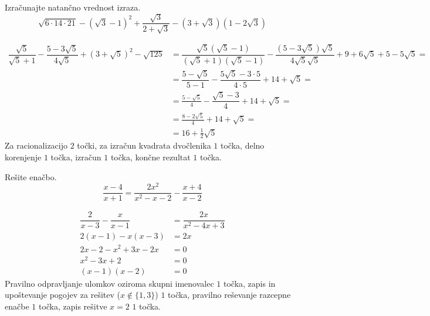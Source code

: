 \documentclass[addpoints]{exam}
\begin{document}
\begin{questions}


    \question[6]
    Izračunajte natančno vrednost izraza.
    $$ \sqrt{6\cdot 14\cdot 21}-\left(\sqrt{3}-1\right)^2+\dfrac{\sqrt{3}}{2+\sqrt{3}}-\left(3+\sqrt{3}\right)\left(1-2\sqrt{3}\right) $$

    \begin{solution}[7cm]
        \begin{align*} 
            \dfrac{\sqrt{5}}{\sqrt{5}+1}-\dfrac{5-3\sqrt{5}}{4\sqrt{5}}+\left(3+\sqrt{5}\right)^2-\sqrt{125}&=\dfrac{\sqrt{5}(\sqrt{5}-1)}{(\sqrt{5}+1)(\sqrt{5}-1)}-\dfrac{(5-3\sqrt{5})\sqrt{5}}{4\sqrt{5}\sqrt{5}}+9+6\sqrt{5}+5-5\sqrt{5}= \\
                                                                                                            &=\dfrac{5-\sqrt{5}}{5-1}-\dfrac{5\sqrt{5}-3\cdot 5}{4\cdot 5}+14+\sqrt{5}= \\
                                                                                                            &=\frac{5-\sqrt{5}}{4}-\dfrac{\sqrt{5}-3}{4}+14+\sqrt{5}= \\
                                                                                                            &=\frac{8-2\sqrt{5}}{4}+14+\sqrt{5}= \\
                                                                                                            &=16+\frac{1}{2}\sqrt{5}
        \end{align*}
        Za racionalizacijo $2$ točki, za izračun kvadrata dvočlenika $1$ točka, delno korenjenje $1$ točka, izračun $1$ točka, končne rezultat $1$ točka.
    \end{solution}
    
    

    \question[4]
    Rešite enačbo.
    $$ \dfrac{x-4}{x+1}=\dfrac{2x^2}{x^2-x-2} - \dfrac{x+4}{x-2} $$
    
    
    \begin{solution}[4cm]
        \begin{align*} 
            \dfrac{2}{x-3}-\dfrac{x}{x-1} &=\dfrac{2x}{x^2-4x+3} \\
            2(x-1)-x(x-3) &= 2x \\
            2x-2-x^2+3x-2x &=0 \\
            x^2-3x+2 &=0 \\
            (x-1)(x-2) &=0
        \end{align*}
        Pravilno odpravljanje ulomkov oziroma skupni imenovalec $1$ točka, zapis in upoštevanje pogojev za rešitev ($x\notin\{1,3\}$) $1$ točka, pravilno reševanje razcepne enačbe $1$ točka, zapis rešitve $x=2$ $1$ točka.
    \end{solution}


\end{questions}
\end{document}
